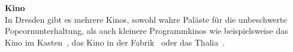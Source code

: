 \begin{multicols}{2}







\textbf{Kino} \\
In Dresden gibt es mehrere Kinos, sowohl wahre Paläste für die unbeschwerte Popcornunterhaltung, als auch kleinere Programmkinos wie beispielsweise das Kino im Kasten~, das Kino in der Fabrik~ oder das Thalia~.



\end{multicols}
